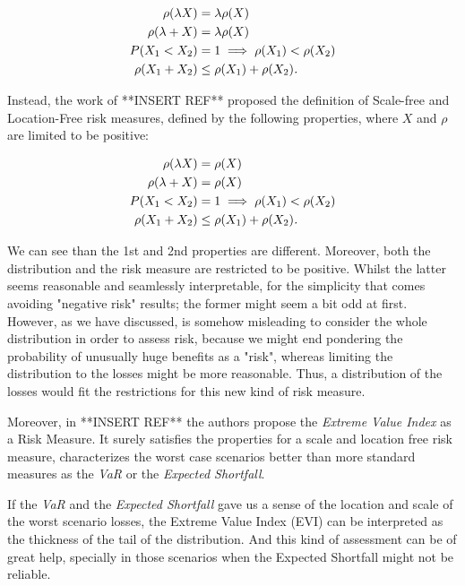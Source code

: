 \begin{align}
\begin{split}
    \rho(\lambda X) &= \lambda \rho (X) \\
    \rho(\lambda  + X) &= \lambda \rho(X) \\
    P(X_1 < X_2) &= 1 \implies \rho(X_1) < \rho(X_2) \\
    \rho(X_1 + X_2) &\leq \rho(X_1) + \rho(X_2) \emph{.}
\end{split}
\end{align}

Instead, the work of **INSERT REF** proposed the definition of Scale-free and Location-Free risk measures, defined by the following properties, where $X$ and $\rho$ are limited to be positive:

\begin{align}
\begin{split}
    \rho(\lambda X) &= \rho(X) \\
    \rho(\lambda + X) &= \rho(X) \\
    P(X_1 < X_2) &= 1 \implies \rho(X_1) < \rho(X_2) \\
    \rho(X_1 + X_2) &\leq \rho(X_1) + \rho(X_2) \emph{.}
\end{split}
\end{align}

We can see than the 1st and 2nd properties are different. Moreover, both the distribution and the risk measure are restricted to be positive. Whilst the latter seems reasonable and seamlessly interpretable, for the simplicity that comes avoiding "negative risk" results; the former might seem a bit odd at first. However, as we have discussed, is somehow misleading to consider the whole distribution in order to assess risk, because we might end pondering the probability of unusually huge benefits as a "risk", whereas limiting the distribution to the losses might be more reasonable. Thus, a distribution of the losses would fit the restrictions for this new kind of risk measure.

Moreover, in **INSERT REF** the authors propose the \emph{Extreme Value Index} as a Risk Measure. It surely satisfies the properties for a scale and location free risk measure, characterizes the worst case scenarios better than more standard measures as the \emph{VaR} or the \emph{Expected Shortfall}.

If the \emph{VaR} and the \emph{Expected Shortfall} gave us a sense of the location and scale of the worst scenario losses, the Extreme Value Index (EVI) can be interpreted as the thickness of the tail of the distribution. And this kind of assessment can be of great help, specially in those scenarios when the Expected Shortfall might not be reliable.

